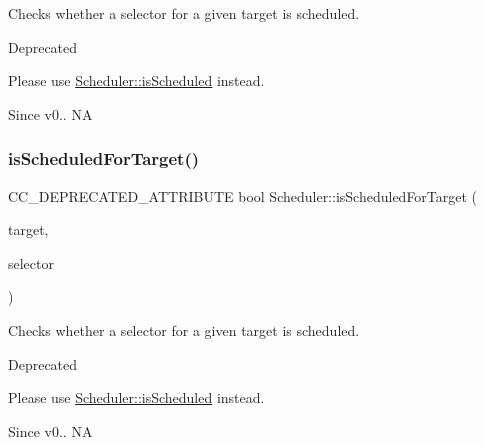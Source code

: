 Checks whether a selector for a given target is scheduled. \begin{DoxyRefDesc}{Deprecated}
\item[\hyperlink{deprecated__deprecated000058}{Deprecated}]Please use \textquotesingle{}\hyperlink{classScheduler_a5b534eae62394806603e522ab4191d3b}{Scheduler\+::is\+Scheduled}\textquotesingle{} instead. \end{DoxyRefDesc}
\begin{DoxySince}{Since}
v0..  NA 
\end{DoxySince}
\mbox{\label{classScheduler_a9cdd2ece7f43eaca5662d12ae0b95a87}} 
\subsubsection{\texorpdfstring{is\+Scheduled\+For\+Target()}{isScheduledForTarget()}\hspace{0.1cm}{\footnotesize\ttfamily [2/2]}}
{\footnotesize\ttfamily C\+C\+\_\+\+D\+E\+P\+R\+E\+C\+A\+T\+E\+D\+\_\+\+A\+T\+T\+R\+I\+B\+U\+TE bool Scheduler\+::is\+Scheduled\+For\+Target (\begin{DoxyParamCaption}\item[{\hyperlink{classRef}{Ref} $\ast$}]{target,  }\item[{S\+E\+L\+\_\+\+S\+C\+H\+E\+D\+U\+LE}]{selector }\end{DoxyParamCaption})\hspace{0.3cm}{\ttfamily [inline]}}

Checks whether a selector for a given target is scheduled. \begin{DoxyRefDesc}{Deprecated}
\item[\hyperlink{deprecated__deprecated000293}{Deprecated}]Please use \textquotesingle{}\hyperlink{classScheduler_a5b534eae62394806603e522ab4191d3b}{Scheduler\+::is\+Scheduled}\textquotesingle{} instead. \end{DoxyRefDesc}
\begin{DoxySince}{Since}
v0..  NA 
\end{DoxySince}
\mbox{\label{classScheduler_aef17d4d358516d712c32ac421202198c}} 
